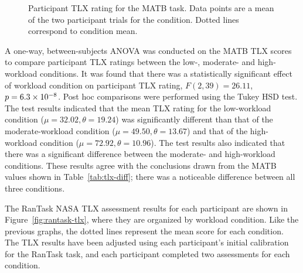\documentclass[11pt]{article}
\begin{document}
		\begin{figure}
		\centering
		\caption[Participant TLX Rating for MATB Task]{Participant TLX rating for the MATB task. Data points are a mean of the two participant trials for the condition. Dotted lines correspond to condition mean.}
		\label{fig:matb-tlx}
		\end{figure} 
		
		A one-way, between-subjects ANOVA was conducted on the MATB TLX scores to compare participant TLX ratings between the low-, moderate- and high-workload conditions. It was found that there was a statistically significant effect of workload condition on participant TLX rating, \(F(2,39) = 26.11\), \(p = \num{6.3e -8}\). Post hoc comparisons were performed using the Tukey HSD test. The test results indicated that the mean TLX rating for the low-workload condition (\(\mu = 32.02, \theta = 19.24\)) was significantly different than that of the moderate-workload condition (\(\mu = 49.50, \theta = 13.67\)) and that of the high-workload condition (\(\mu = 72.92, \theta = 10.96\)). The test results also indicated that there was a significant difference between the moderate- and high-workload conditions. These results agree with the conclusions drawn from the MATB values shown in Table~\ref{tab:tlx-diff}; there was a noticeable difference between all three conditions.
		
		\begin{table}[]
		\caption[NASA-TLX Difference Between Conditions]{Mean NASA-TLX Difference Between Conditions}
		\centering
		\label{tab:tlx-diff}
		\end{table}
	
		The RanTask NASA TLX assessment results for each participant are shown in Figure~\ref{fig:rantask-tlx}, where they are organized by workload condition. Like the previous graphs, the dotted lines represent the mean score for each condition. The TLX results have been adjusted using each participant's initial calibration for the RanTask task, and each participant completed two assessments for each condition.
		
\end{document}
